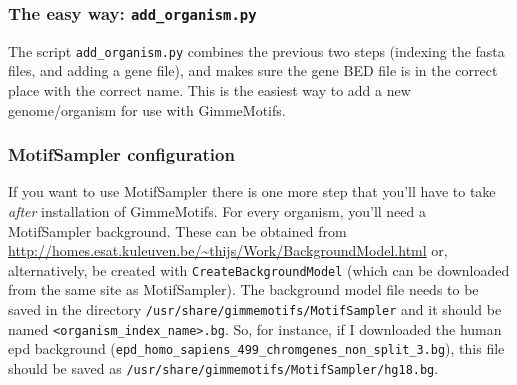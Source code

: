 \documentclass[10pt]{article}
\begin{document}
\subsubsection{The easy way: \texttt{add\_organism.py}}
The script \texttt{add\_organism.py} combines the previous two steps (indexing the fasta files, and adding a gene file), and makes sure the gene BED file is in the correct place with the correct name. This is the easiest way to add a new genome/organism for use with GimmeMotifs.

\subsubsection{MotifSampler configuration}
\label{sec:MotifSampler}
If you want to use MotifSampler there is one more step that you'll have to take \emph{after} installation of GimmeMotifs. For every organism, you'll need a MotifSampler background. These can be obtained from \url{http://homes.esat.kuleuven.be/~thijs/Work/BackgroundModel.html} or, alternatively, be created with \texttt{CreateBackgroundModel} (which can be downloaded from the same site as MotifSampler). The background model file needs to be saved in the directory \texttt{/usr/share/gimmemotifs/MotifSampler} and it should be named \texttt{<organism\_index\_name>.bg}. So, for instance, if I downloaded the human epd background (\texttt{epd\_homo\_sapiens\_499\_chromgenes\_non\_split\_3.bg}), this file should be saved as \texttt{/usr/share/gimmemotifs/MotifSampler/hg18.bg}.
\end{document}

